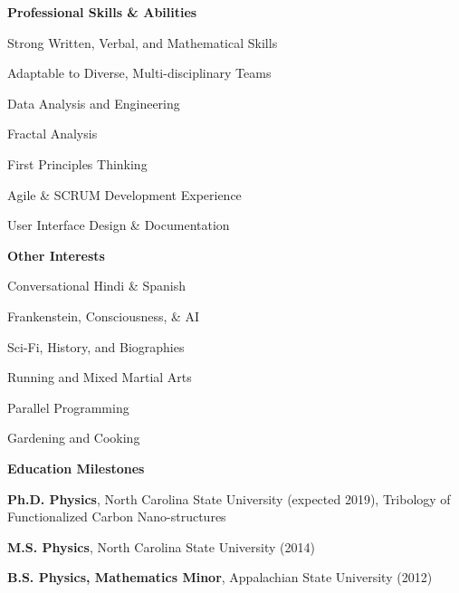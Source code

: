 \documentclass[letterpaper,final]{memoir}
\newcommand{\LargeSep}{\vspace{1.3em}}
\newcommand{\Sep}{\vspace{1.0em}}
\newcommand{\SmallSep}{\vspace{0.4em}}
\newcommand{\CVSection}[1]
	{\LARGE\textbf{#1}\par
	\SmallSep\normalsize}
\newcommand{\CVItem}[1]
	{\textbf{\color{Blue} #1}}
\begin{document}
\CVItem{Professional Skills \& Abilities}
\Sep

\begin{multicols}{2}

    \begin{compactitem}[\color{Blue}$\circ$]

        \item Strong Written, Verbal, and Mathematical Skills
        \item Adaptable to Diverse, Multi-disciplinary Teams
        \item Data Analysis and Engineering
        \item Fractal Analysis
        \item First Principles Thinking
        \item Agile \& SCRUM Development Experience
        \item User Interface Design \&  Documentation
        
	\end{compactitem}

\end{multicols}

\Sep

\CVItem{Other Interests}
\Sep

\begin{multicols}{2}

    \begin{compactitem}[\color{Blue}$\circ$] 
        
        \item Conversational  Hindi \& Spanish
        \item Frankenstein, Consciousness, \& AI

        \item Sci-Fi, History, and Biographies
		\item Running and Mixed Martial Arts

        \item Parallel Programming
        \item Gardening and Cooking
        

	\end{compactitem}
\end{multicols}
\LargeSep


\newpage

\notoserif \CVSection{Education Milestones}
\normalfont
\Sep
\begin{compactitem}[\color{Blue}$\circ$]

\item \textbf{Ph.D. Physics}, North Carolina State University (expected 2019), Tribology of Functionalized Carbon Nano-structures
\SmallSep

\item \textbf{M.S. Physics}, North Carolina State University (2014)
\SmallSep

\item \textbf{B.S. Physics, Mathematics Minor}, Appalachian State University (2012)

\end{compactitem}
\Sep
\end{document}
